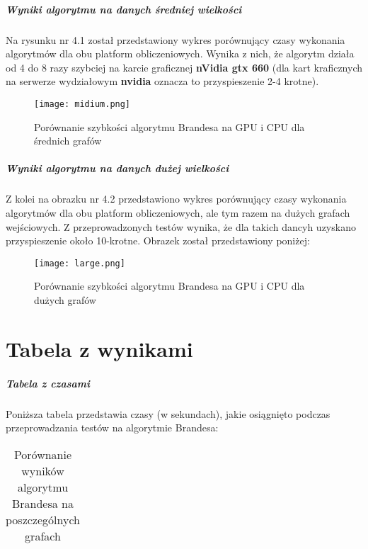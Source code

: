 \documentclass[oneside]{book}
\begin{document}
\paragraph{Wyniki algorytmu na danych średniej wielkości} Na rysunku nr 4.1 został przedstawiony wykres porównujący czasy wykonania algorytmów dla obu platform obliczeniowych. Wynika z nich, że algorytm działa od 4 do 8 razy szybciej na karcie graficznej \textbf{nVidia gtx 660} (dla kart kraficznych na serwerze wydziałowym \textbf{nvidia} oznacza to przyspieszenie 2-4 krotne).



\begin{figure}[H]
  \centering
  \texttt{[image: midium.png]}
  \caption{Porównanie szybkości algorytmu Brandesa na GPU i CPU dla średnich grafów}
\end{figure}



\paragraph{Wyniki algorytmu na danych dużej wielkości} Z kolei na obrazku nr 4.2 przedstawiono wykres porównujący czasy wykonania algorytmów dla obu platform obliczeniowych, ale tym razem na dużych grafach wejściowych. Z przeprowadzonych testów wynika, że dla takich dancyh uzyskano przyspieszenie około 10-krotne. Obrazek został przedstawiony poniżej: 
\begin{figure}[H]
  \centering
  \texttt{[image: large.png]}
  \caption{Porównanie szybkości algorytmu Brandesa na GPU i CPU dla dużych grafów}
\end{figure}



\chapter{Tabela z wynikami}

\paragraph{Tabela z czasami} Poniższa tabela przedstawia czasy (w sekundach), jakie osiągnięto podczas przeprowadzania testów na algorytmie Brandesa:

\begin{table}[H]

 \begin{tabularx}{\textwidth}{ l | r }                                                      
  \hline                                                                                                                                     \hline                                                                          
  \end{tabularx}   
 \caption{Porównanie wyników algorytmu Brandesa na poszczególnych grafach}
\end{table}
\end{document}
